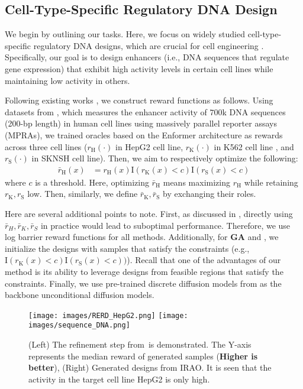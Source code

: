 \subsection{Cell-Type-Specific Regulatory DNA Design} \label{sec:DNA}

We begin by outlining our tasks. Here, we focus on widely studied cell-type-specific regulatory DNA designs, which are crucial for cell engineering \citep{taskiran2024cell}. Specifically, our goal is to design enhancers (i.e., DNA sequences that regulate gene expression) that exhibit high activity levels in certain cell lines while maintaining low activity in others. 

Following existing works \citep{lal2024reglm,sarkar2024designing,gosai2023machine}, we construct reward functions as follows. Using datasets from \citet{gosai2023machine}, which measures the enhancer activity of $700$k DNA sequences (200-bp length) in human cell lines using massively parallel reporter assays (MPRAs), we trained oracles based on the Enformer architecture \citep{avsec2021effective} as rewards across three cell lines ($r_{\mathrm{H}}(\cdot)$ in HepG2 cell line,
$r_{\mathrm{K}}(\cdot)$ in K562 cell line , and $r_{\mathrm{S}}(\cdot)$ in SKNSH cell line). Then, we aim to respectively optimize the following:
\begin{align}\label{eq:reward_original}
    \bar r_{\mathrm{H}}(x)  &= r_{\mathrm{H}}(x)\mathrm{I}(r_{\mathrm{K}}(x)<c)\mathrm{I}(r_{\mathrm{S}}(x)<c)
\end{align}
where $c$ is a threshold. Here, optimizing $\bar r_{\mathrm{H}}$ means maximizing $r_{\mathrm{H}}$ while retaining $r_{\mathrm{K}},r_{\mathrm{S}}$ low. Then, similarly, we define $\bar r_{\mathrm{K}},\bar r_{\mathrm{S}}$ by exchanging their roles.  

Here are several additional points to note. First, as discussed in , directly using $\bar r_H, \bar r_K, \bar r_S$ in practice would lead to suboptimal performance. Therefore, we use log barrier reward functions for all methods. Additionally, for \textbf{GA} and \alg, we initialize the designs with samples that satisfy the constraints (e.g., $\mathrm{I}(r_{\mathrm{K}}(x)<c)\mathrm{I}(r_{\mathrm{S}}(x)<c))$). Recall that one of the advantages of our method is its ability to leverage designs from feasible regions that satisfy the constraints. Finally, we use pre-trained discrete diffusion models from \citet{wang2024fine} as the backbone unconditional diffusion models.


\begin{figure}[!th]
    \centering
     \texttt{[image: images/RERD\_HepG2.png]}
     \texttt{[image: images/sequence\_DNA.png]}
    \caption{(Left) The refinement step from \alg\,is demonstrated. The Y-axis represents the median reward of generated samples (\textbf{Higher is better}), (Right) Generated designs from IRAO. It is seen that the activity in the target cell line HepG2 is only high. }
    \label{fig:refinement_cell}
\end{figure}




